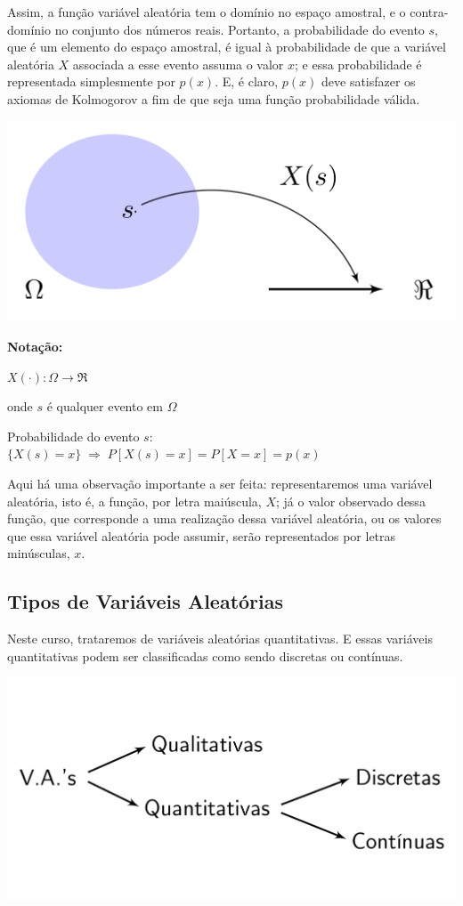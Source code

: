 \documentclass[
]{book}
\theoremstyle{definition}
\theoremstyle{definition}
\theoremstyle{definition}
\theoremstyle{remark}
\begin{document}
Assim, a função variável aleatória tem o domínio no espaço amostral, e o contra-domínio no conjunto dos números reais. Portanto, a probabilidade do evento \(s\), que é um elemento do espaço amostral, é igual à probabilidade de que a variável aleatória \(X\) associada a esse evento assuma o valor \(x\); e essa probabilidade é representada simplesmente por \(p(x)\). E, é claro, \(p(x)\) deve satisfazer os axiomas de Kolmogorov a fim de que seja uma função probabilidade válida.

\includegraphics[width=0.6\linewidth]{img/va/va}

\textbf{Notação:}

\(X(\cdot): \Omega \rightarrow \Re\)

onde \(s\) é qualquer evento em \(\Omega\)

Probabilidade do evento \(s\):
\(\{X(s) = x\} \; \Rightarrow \; P[X(s) = x] = P[X = x] = p(x)\)

Aqui há uma observação importante a ser feita: representaremos uma variável aleatória, isto é, a função, por letra maiúscula, \(X\); já o valor observado dessa função, que corresponde a uma realização dessa variável aleatória, ou os valores que essa variável aleatória pode assumir, serão representados por letras minúsculas, \(x\).

\hypertarget{tipos-de-variuxe1veis-aleatuxf3rias}{%
\subsection*{Tipos de Variáveis Aleatórias}\label{tipos-de-variuxe1veis-aleatuxf3rias}}

Neste curso, trataremos de variáveis aleatórias quantitativas. E essas variáveis quantitativas podem ser classificadas como sendo discretas ou contínuas.

\includegraphics[width=0.7\linewidth]{img/va/va-tipos}
\end{document}
